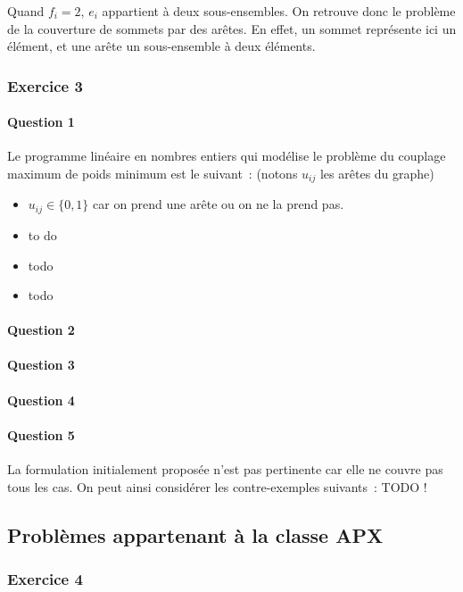 \documentclass[a4paper, 12pt]{article}
\begin{document}
Quand $f_i = 2$, $e_i$ appartient à deux sous-ensembles. On retrouve
donc le problème de la couverture de sommets par des arêtes. En effet,
un sommet représente ici un élément, et une arête un sous-ensemble à
deux éléments.

\subsubsection*{Exercice 3}

\paragraph{Question 1}Le programme linéaire en nombres entiers qui modélise le
  problème du couplage maximum de poids minimum est le suivant~:
  (notons $u_{ij}$ les arêtes du graphe)
\begin{itemize}
\item $u_{ij} \in \{0, 1\}$ car on prend une arête ou on ne la prend pas.
\item to do
\item todo
\item todo
\end{itemize}

\paragraph{Question 2}
\paragraph{Question 3}
\paragraph{Question 4}
\paragraph{Question 5}
La formulation initialement proposée n'est pas pertinente car elle ne couvre pas tous les cas. On peut ainsi considérer
les contre-exemples suivants~: TODO !

\subsection{Problèmes appartenant à la classe APX}

\subsubsection*{Exercice 4}
\end{document}
